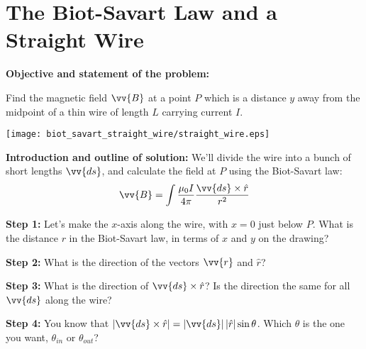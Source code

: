 \section{The Biot-Savart Law and a Straight Wire}
\label{biot_savart_straight_wire}

\begin{comment}
This "lab" is by Matt Trawick, 10/2015.  
\end{comment}

\makelabheader %

\vspace{0.5cm}

\textbf{Objective and statement of the problem:}

Find the magnetic field $\vv{B}$ at a point $P$ which is a distance $y$ away from the midpoint of a thin wire of length $L$ carrying current $I$.
\begin{center}
    \texttt{[image: biot\_savart\_straight\_wire/straight\_wire.eps]}
\end{center}

\textbf{Introduction and outline of solution:}
We'll divide the wire into a bunch of short lengths $\vv{ds}$, and calculate the field at $P$ using the Biot-Savart law:
\begin{displaymath}
\vv{B} = \int{\frac{\mu_0I}{4 \pi}\frac{\vv{ds}\times \hat{r}}{r^2}}
\end{displaymath}

\textbf{Step 1:} \newline
Let's make the $x$-axis along the wire, with $x=0$ just below $P$.  What is the distance $r$ in the Biot-Savart law, in terms of $x$ and $y$ on the drawing?

\vspace{.6in}


\textbf{Step 2:} \newline
What is the direction of the vectors $\vv{r}$ and $\hat{r}$?



\vspace{.6in}

\textbf{Step 3:} \newline
What is the direction of  $\vv{ds}\times \hat{r}$?  Is the direction the same for all $\vv{ds}$ along the wire? 

\vspace{.6in}


\textbf{Step 4:} \newline
You know that $\left|\vv{ds}\times \hat{r}\right|=\left|\vv{ds}\right|  \left|\hat{r}\right|\sin\theta$.  Which $\theta$ is the one you want, $\theta_{in}$ or $\theta_{out}$?

